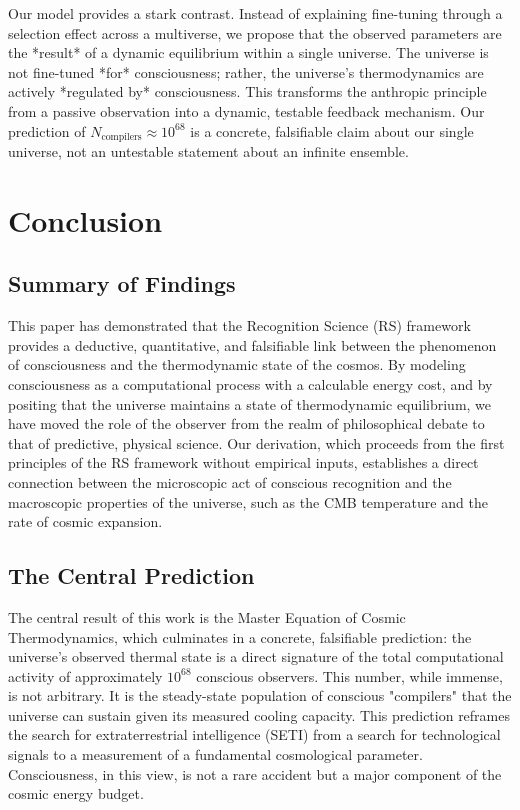 \documentclass[11pt,a4paper]{article}
\theoremstyle{definition}
\theoremstyle{remark}
\begin{document}
Our model provides a stark contrast. Instead of explaining fine-tuning through a selection effect across a multiverse, we propose that the observed parameters are the *result* of a dynamic equilibrium within a single universe. The universe is not fine-tuned *for* consciousness; rather, the universe's thermodynamics are actively *regulated by* consciousness. This transforms the anthropic principle from a passive observation into a dynamic, testable feedback mechanism. Our prediction of \(N_{\text{compilers}} \approx 10^{68}\) is a concrete, falsifiable claim about our single universe, not an untestable statement about an infinite ensemble.

\section{Conclusion}

\subsection{Summary of Findings}
This paper has demonstrated that the Recognition Science (RS) framework provides a deductive, quantitative, and falsifiable link between the phenomenon of consciousness and the thermodynamic state of the cosmos. By modeling consciousness as a computational process with a calculable energy cost, and by positing that the universe maintains a state of thermodynamic equilibrium, we have moved the role of the observer from the realm of philosophical debate to that of predictive, physical science. Our derivation, which proceeds from the first principles of the RS framework without empirical inputs, establishes a direct connection between the microscopic act of conscious recognition and the macroscopic properties of the universe, such as the CMB temperature and the rate of cosmic expansion.

\subsection{The Central Prediction}
The central result of this work is the Master Equation of Cosmic Thermodynamics, which culminates in a concrete, falsifiable prediction: the universe's observed thermal state is a direct signature of the total computational activity of approximately \(10^{68}\) conscious observers. This number, while immense, is not arbitrary. It is the steady-state population of conscious "compilers" that the universe can sustain given its measured cooling capacity. This prediction reframes the search for extraterrestrial intelligence (SETI) from a search for technological signals to a measurement of a fundamental cosmological parameter. Consciousness, in this view, is not a rare accident but a major component of the cosmic energy budget.
\end{document}
